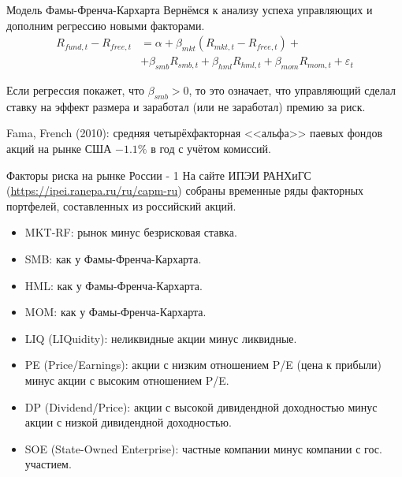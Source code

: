 \documentclass{beamer}
\begin{document}
\begin{frame}{Модель Фамы-Френча-Кархарта}
\justify
Вернёмся к анализу успеха управляющих и дополним регрессию новыми факторами.
\begin{align*}
R_{fund,t} - R_{free,t} &= \alpha + \beta_{mkt}(R_{mkt,t} - R_{free,t}) + \\
&+ \beta_{smb}R_{smb,t} + \beta_{hml}R_{hml,t} + \beta_{mom}R_{mom,t}
 + \varepsilon_t
\end{align*}

\justify
Если регрессия покажет, что $\beta_{smb} > 0$, то это означает, что управляющий 
сделал ставку на эффект размера и заработал (или не заработал) премию за риск.

\justify
Fama, French (2010): средняя четырёхфакторная <<альфа>> паевых фондов акций на 
рынке США $-1.1\%$ в год с учётом комиссий.
\end{frame}



\begin{frame}{Факторы риска на рынке России - 1}
\justify
На сайте ИПЭИ РАНХиГС ({\small \url{https://ipei.ranepa.ru/ru/capm-ru}}) 
собраны временные ряды факторных портфелей, составленных из российский акций.
\begin{itemize}
\justifying
\item MKT-RF: рынок минус безрисковая ставка.
\item SMB: как у Фамы-Френча-Кархарта.
\item HML: как у Фамы-Френча-Кархарта.
\item MOM: как у Фамы-Френча-Кархарта.
\item LIQ (LIQuidity): неликвидные акции минус ликвидные.
\item PE (Price/Earnings): акции с низким отношением P/E (цена к прибыли) минус 
акции с высоким отношением P/E.
\item DP (Dividend/Price): акции с высокой дивидендной доходностью минус акции 
с низкой дивидендной доходностью.
\item SOE (State-Owned Enterprise): частные компании минус компании с гос. 
участием.
\end{itemize}
\end{frame}
\end{document}
